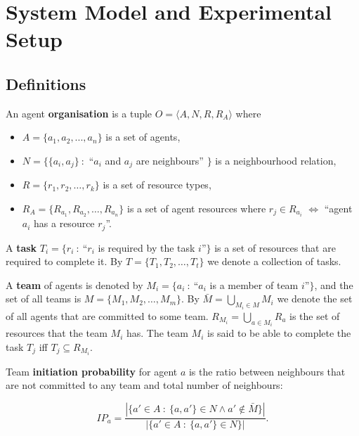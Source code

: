 \documentclass{llncs}
\newcommand{\comment}[1]{{\color{red}{[\sf #1]}}}
\begin{document}
\section{System Model and Experimental Setup}

\subsection{Definitions}

\comment{introduce the definitions section}

\begin{definition}
An agent \textbf{organisation} is a tuple $O=\langle A, N, R, R_A  \rangle$ where
\noindent
\begin{itemize}
\item $A= \{ a_1,a_2,...,a_n \} $ is a set of agents,
\item $N=\{\{a_i,a_j \}\ :$ ``$a_i$ and $a_j$ are neighbours'' $\}$ is a neighbourhood relation,
\item $R=\{r_1,r_2,\dots,r_k\}$ is a set of resource types,
\item $R_A=\{R_{a_1}, R_{a_2}, \dots, R_{a_n}\}$ is a set of agent resources where $r_j \in R_{a_i} $ $\iff$ ``agent $a_i$ has a resource $r_j$''.
\end{itemize}
\end{definition}

\begin{definition}
A \textbf{task} $T_i=\{r_i\ :\ $``$r_i$ is required by the task $i$''$\}$ is a set of resources that are required to complete it. By $T=\{T_1, T_2,\dots, T_t\}$ we denote a collection of tasks.
\end{definition}

\begin{definition}
A \textbf{team} of agents is denoted by $M_i=\{a_i\ :\ $``$a_i$ is a member of team $i$''$\}$, and the set of all teams is $M=\{M_1, M_2,\dots , M_m\}$. By $\bar{M} = \bigcup_{M_i \in M} M_i$ we denote the set of all agents that are committed to some team. $R_{M_i}=\bigcup_{a \in M_i}R_{a}$ is the set of resources that the team $M_i$ has. The team $M_i$ is said to be able to complete the task $T_j$ iff $T_j \subseteq R_{M_i}$.
\end{definition}

\begin{definition}
Team \textbf{initiation probability} for agent $a$ is the ratio between neighbours that are not committed to any team and total number of neighbours:

\begin{equation}
IP_a = \frac{|\{ a' \in A\ :\ \{a, a'\} \in N \wedge a' \notin \bar{M}  \}|}{|\{ a' \in A\ :\ \{a, a'\} \in N \}|}.
\label{eq:init_prob}
\end{equation}

\end{definition}
\end{document}
